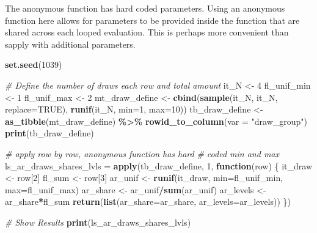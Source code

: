 \documentclass[
]{book}
\newenvironment{Shaded}{\begin{snugshade}}{\end{snugshade}}
\newcommand{\CommentTok}[1]{\textcolor[rgb]{0.56,0.35,0.01}{\textit{#1}}}
\newcommand{\ControlFlowTok}[1]{\textcolor[rgb]{0.13,0.29,0.53}{\textbf{#1}}}
\newcommand{\DataTypeTok}[1]{\textcolor[rgb]{0.13,0.29,0.53}{#1}}
\newcommand{\DecValTok}[1]{\textcolor[rgb]{0.00,0.00,0.81}{#1}}
\newcommand{\KeywordTok}[1]{\textcolor[rgb]{0.13,0.29,0.53}{\textbf{#1}}}
\newcommand{\NormalTok}[1]{#1}
\newcommand{\OperatorTok}[1]{\textcolor[rgb]{0.81,0.36,0.00}{\textbf{#1}}}
\newcommand{\OtherTok}[1]{\textcolor[rgb]{0.56,0.35,0.01}{#1}}
\newcommand{\StringTok}[1]{\textcolor[rgb]{0.31,0.60,0.02}{#1}}
\begin{document}
The anonymous function has hard coded parameters. Using an anonymous function here allows for parameters to be provided inside the function that are shared across each looped evaluation. This is perhaps more convenient than sapply with additional parameters.

\begin{Shaded}
\begin{Highlighting}[]
\KeywordTok{set.seed}\NormalTok{(}\DecValTok{1039}\NormalTok{)}

\CommentTok{\# Define the number of draws each row and total amount}
\NormalTok{it\_N \textless{}{-}}\StringTok{ }\DecValTok{4}
\NormalTok{fl\_unif\_min \textless{}{-}}\StringTok{ }\DecValTok{1}
\NormalTok{fl\_unif\_max \textless{}{-}}\StringTok{ }\DecValTok{2}
\NormalTok{mt\_draw\_define \textless{}{-}}\StringTok{ }\KeywordTok{cbind}\NormalTok{(}\KeywordTok{sample}\NormalTok{(it\_N, it\_N, }\DataTypeTok{replace=}\OtherTok{TRUE}\NormalTok{),}
                        \KeywordTok{runif}\NormalTok{(it\_N, }\DataTypeTok{min=}\DecValTok{1}\NormalTok{, }\DataTypeTok{max=}\DecValTok{10}\NormalTok{))}
\NormalTok{tb\_draw\_define \textless{}{-}}\StringTok{ }\KeywordTok{as\_tibble}\NormalTok{(mt\_draw\_define) }\OperatorTok{\%\textgreater{}\%}
\StringTok{  }\KeywordTok{rowid\_to\_column}\NormalTok{(}\DataTypeTok{var =} \StringTok{"draw\_group"}\NormalTok{)}
\KeywordTok{print}\NormalTok{(tb\_draw\_define)}

\CommentTok{\# apply row by row, anonymous function has hard}
\CommentTok{\# coded min and max}
\NormalTok{ls\_ar\_draws\_shares\_lvls =}
\StringTok{  }\KeywordTok{apply}\NormalTok{(tb\_draw\_define,}
        \DecValTok{1}\NormalTok{,}
        \ControlFlowTok{function}\NormalTok{(row) \{}
\NormalTok{          it\_draw \textless{}{-}}\StringTok{ }\NormalTok{row[}\DecValTok{2}\NormalTok{]}
\NormalTok{          fl\_sum \textless{}{-}}\StringTok{ }\NormalTok{row[}\DecValTok{3}\NormalTok{]}
\NormalTok{          ar\_unif \textless{}{-}}\StringTok{ }\KeywordTok{runif}\NormalTok{(it\_draw,}
                           \DataTypeTok{min=}\NormalTok{fl\_unif\_min,}
                           \DataTypeTok{max=}\NormalTok{fl\_unif\_max)}
\NormalTok{          ar\_share \textless{}{-}}\StringTok{ }\NormalTok{ar\_unif}\OperatorTok{/}\KeywordTok{sum}\NormalTok{(ar\_unif)}
\NormalTok{          ar\_levels \textless{}{-}}\StringTok{ }\NormalTok{ar\_share}\OperatorTok{*}\NormalTok{fl\_sum}
          \KeywordTok{return}\NormalTok{(}\KeywordTok{list}\NormalTok{(}\DataTypeTok{ar\_share=}\NormalTok{ar\_share,}
                      \DataTypeTok{ar\_levels=}\NormalTok{ar\_levels))}
\NormalTok{        \})}

\CommentTok{\# Show Results}
\KeywordTok{print}\NormalTok{(ls\_ar\_draws\_shares\_lvls)}
\end{Highlighting}
\end{Shaded}
\end{document}
